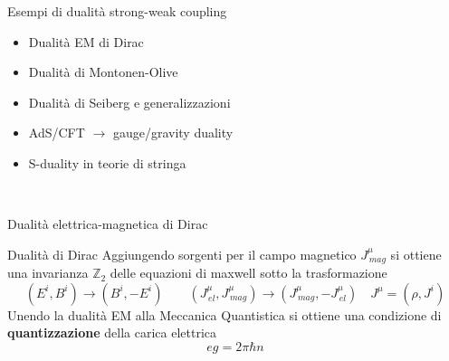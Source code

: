 \documentclass[10pt,compress,usenames,dvipsnames]{beamer}
\begin{document}
\begin{frame}{Esempi di dualità strong-weak coupling}
\vspace{-0,7cm}
\begin{itemize}
\item Dualità EM di Dirac
\item Dualità di Montonen-Olive
\item Dualità di Seiberg e generalizzazioni
\item AdS/CFT $\rightarrow$ gauge/gravity duality 
\item S-duality in teorie di stringa
\end{itemize}

\vspace{1cm}
\\[0,5cm]

\end{frame}

\begin{frame}{Dualità elettrica-magnetica di Dirac}

\begin{block}{Dualità di Dirac}
Aggiungendo sorgenti per il campo magnetico $J_{\, mag}^{\mu}$ si ottiene una invarianza $\mathbb{Z}_2$ delle equazioni di maxwell sotto la trasformazione
\begin{equation*}
 \left( {E}^i, {B}^i \right) \longrightarrow \left({B}^i, - {E}^i \right)
 \qquad \left( J_{\, el}^{\mu }, J_{\, mag}^{\mu} \right) \longrightarrow \left( 
 J_{\, mag}^{\mu},  - J_{\, el}^{\mu }
 \right)
 \quad  J^{\mu} = ( \rho , J^i)
\end{equation*}
Unendo la dualità EM alla Meccanica Quantistica si ottiene una condizione di \alert{\bfseries quantizzazione} della carica elettrica
$$
e g  = 2 \pi \hbar n
$$
\vspace{-0,3cm}
\end{block}

\vspace{0.5cm}
\end{frame}
\end{document}
